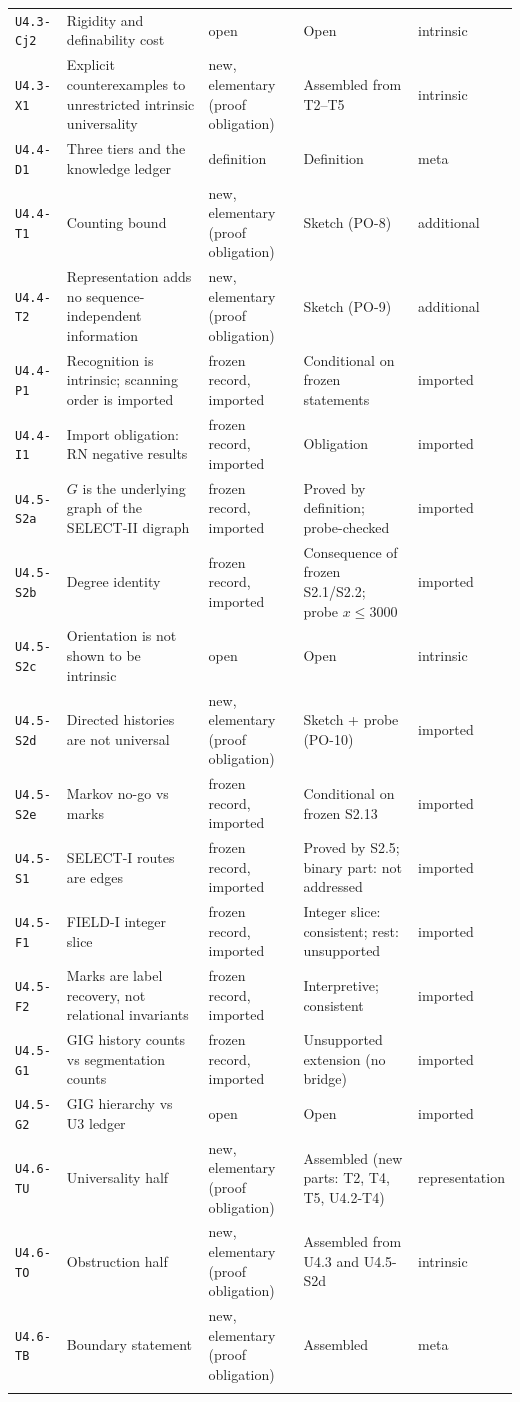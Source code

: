 \documentclass[11pt]{article}
\begin{document}
\begin{longtable}{@{}p{1.25cm}p{4.9cm}p{3.0cm}p{3.6cm}p{1.6cm}@{}}
\texttt{U4.3-Cj2} & Rigidity and definability cost & open & Open & intrinsic\\
\texttt{U4.3-X1} & Explicit counterexamples to unrestricted intrinsic universality & new, elementary (proof obligation) & Assembled from T2--T5 & intrinsic\\
\texttt{U4.4-D1} & Three tiers and the knowledge ledger & definition & Definition & meta\\
\texttt{U4.4-T1} & Counting bound & new, elementary (proof obligation) & Sketch (PO-8) & additional\\
\texttt{U4.4-T2} & Representation adds no sequence-independent information & new, elementary (proof obligation) & Sketch (PO-9) & additional\\
\texttt{U4.4-P1} & Recognition is intrinsic; scanning order is imported & frozen record, imported & Conditional on frozen statements & imported\\
\texttt{U4.4-I1} & Import obligation: RN negative results & frozen record, imported & Obligation & imported\\
\texttt{U4.5-S2a} & $G$ is the underlying graph of the SELECT-II digraph & frozen record, imported & Proved by definition; probe-checked & imported\\
\texttt{U4.5-S2b} & Degree identity & frozen record, imported & Consequence of frozen S2.1/S2.2; probe $x\le3000$ & imported\\
\texttt{U4.5-S2c} & Orientation is not shown to be intrinsic & open & Open & intrinsic\\
\texttt{U4.5-S2d} & Directed histories are not universal & new, elementary (proof obligation) & Sketch + probe (PO-10) & imported\\
\texttt{U4.5-S2e} & Markov no-go vs marks & frozen record, imported & Conditional on frozen S2.13 & imported\\
\texttt{U4.5-S1} & SELECT-I routes are edges & frozen record, imported & Proved by S2.5; binary part: not addressed & imported\\
\texttt{U4.5-F1} & FIELD-I integer slice & frozen record, imported & Integer slice: consistent; rest: unsupported & imported\\
\texttt{U4.5-F2} & Marks are label recovery, not relational invariants & frozen record, imported & Interpretive; consistent & imported\\
\texttt{U4.5-G1} & GIG history counts vs segmentation counts & frozen record, imported & Unsupported extension (no bridge) & imported\\
\texttt{U4.5-G2} & GIG hierarchy vs U3 ledger & open & Open & imported\\
\texttt{U4.6-TU} & Universality half & new, elementary (proof obligation) & Assembled (new parts: T2, T4, T5, U4.2-T4) & representation\\
\texttt{U4.6-TO} & Obstruction half & new, elementary (proof obligation) & Assembled from U4.3 and U4.5-S2d & intrinsic\\
\texttt{U4.6-TB} & Boundary statement & new, elementary (proof obligation) & Assembled & meta\\
\\\bottomrule\end{longtable}
\end{document}
